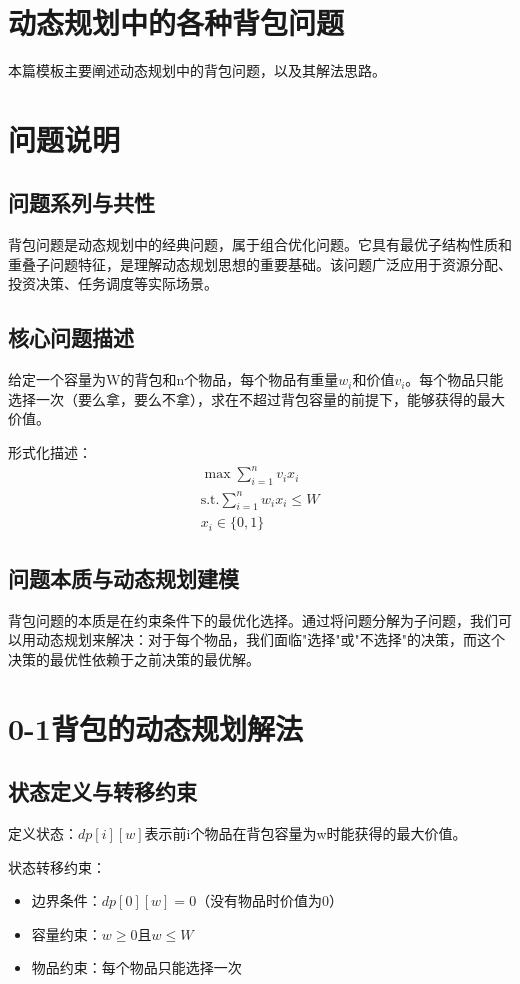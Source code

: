 \section*{动态规划中的各种背包问题}
本篇模板主要阐述动态规划中的背包问题，以及其解法思路。


\section{问题说明}

\subsection{问题系列与共性}
背包问题是动态规划中的经典问题，属于组合优化问题。它具有最优子结构性质和重叠子问题特征，是理解动态规划思想的重要基础。该问题广泛应用于资源分配、投资决策、任务调度等实际场景。

\subsection{核心问题描述}
给定一个容量为W的背包和n个物品，每个物品有重量$w_i$和价值$v_i$。每个物品只能选择一次（要么拿，要么不拿），求在不超过背包容量的前提下，能够获得的最大价值。

形式化描述：
\begin{align}
\max \sum_{i=1}^{n} v_i x_i \\
\text{s.t.} \sum_{i=1}^{n} w_i x_i \leq W \\
x_i \in \{0, 1\}
\end{align}

\subsection{问题本质与动态规划建模}
背包问题的本质是在约束条件下的最优化选择。通过将问题分解为子问题，我们可以用动态规划来解决：对于每个物品，我们面临"选择"或"不选择"的决策，而这个决策的最优性依赖于之前决策的最优解。

\section{0-1背包的动态规划解法}

\subsection{状态定义与转移约束}
定义状态：$dp[i][w]$表示前i个物品在背包容量为w时能获得的最大价值。

状态转移约束：
\begin{itemize}
\item 边界条件：$dp[0][w] = 0$（没有物品时价值为0）
\item 容量约束：$w \geq 0$且$w \leq W$
\item 物品约束：每个物品只能选择一次
\end{itemize}

